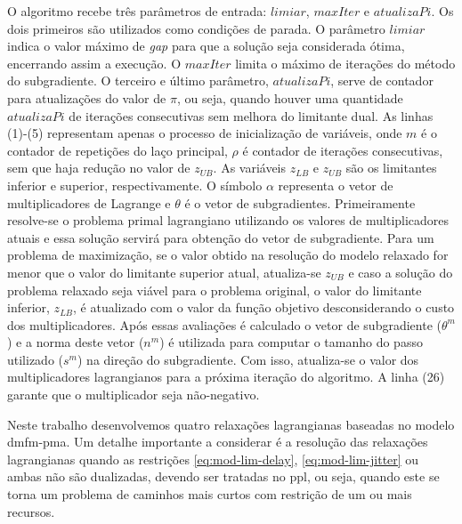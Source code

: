 O algoritmo recebe  três parâmetros de entrada:  $limiar$, $maxIter$ e
$atualizaPi$.   Os dois  primeiros  são utilizados  como condições  de
parada. O  parâmetro $limiar$  indica o  valor máximo  de \textit{gap}
para  que  a  solução  seja  considerada  ótima,  encerrando  assim  a
execução.   O $maxIter$  limita o  máximo  de iterações  do método  do
subgradiente. O  terceiro e  último parâmetro, $atualizaPi$,  serve de
contador para atualizações  do valor de $\pi$, ou  seja, quando houver
uma quantidade  $atualizaPi$ de iterações consecutivas  sem melhora do
limitante dual.   As linhas (1)-(5)  representam apenas o  processo de
inicialização de  variáveis, onde  $m$ é o  contador de  repetições do
laço principal, $\rho$  é contador de iterações  consecutivas, sem que
haja redução  no valor de  $z_{UB}$. As variáveis $z_{LB}$  e $z_{UB}$
são  os limitantes  inferior  e superior,  respectivamente. O  símbolo
$\alpha$ representa o vetor de  multiplicadores de Lagrange e $\theta$
é  o  vetor de  subgradientes.   Primeiramente  resolve-se o  problema
primal lagrangiano  utilizando os valores de  multiplicadores atuais e
essa solução servirá para obtenção  do vetor de subgradiente.  Para um
problema  de maximização,  se o  valor obtido  na resolução  do modelo
relaxado  for  menor   que  o  valor  do   limitante  superior  atual,
atualiza-se $z_{UB}$ e caso a solução do problema relaxado seja viável
para o problema  original, o valor do limitante  inferior, $z_{LB}$, é
atualizado com o valor da  função objetivo desconsiderando o custo dos
multiplicadores.   Após  essas  avaliações  é  calculado  o  vetor  de
subgradiente ($\theta^m$)  e a norma  deste vetor ($n^m$)  é utilizada
para  computar o  tamanho do  passo  utilizado ($s^m$)  na direção  do
subgradiente.   Com  isso,  atualiza-se o  valor  dos  multiplicadores
lagrangianos  para  a próxima  iteração  do  algoritmo. A  linha  (26)
garante que o multiplicador seja não-negativo.

Neste trabalho  desenvolvemos quatro relaxações  lagrangianas baseadas
no  modelo \gls{dmfm-pma}.   Um detalhe  importante a  considerar é  a
resolução   das   relaxações   lagrangianas   quando   as   restrições
\eqref{eq:mod-lim-delay}, \eqref{eq:mod-lim-jitter}  ou ambas  não são
dualizadas, devendo ser tratadas no \gls{ppl}, ou seja, quando este se
torna um problema de caminhos mais  curtos com restrição de um ou mais
recursos.

